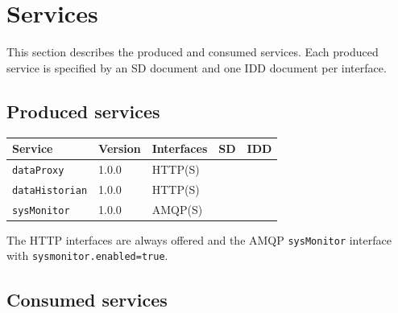 \documentclass[a4paper]{arrowhead}
\begin{document}
\newpage

\section{Services}
\label{sec:services}

This section describes the produced and consumed services. Each produced service is specified by an SD document and one IDD document per interface.

\subsection{Produced services}

\noindent\begin{longtable}{| p{5.3cm} | p{1.3cm} | p{2.6cm} | p{1.6cm} | p{3.6cm} |} \hline
\rowcolor{gray!33} Service & Version & Interfaces & SD & IDD \\ \hline \endhead
\texttt{dataProxy} & 1.0.0 & HTTP(S) & \cite{dm-dataProxy-sd} & \cite{dm-dataProxy-http-idd} \\ \hline
\texttt{dataHistorian} & 1.0.0 & HTTP(S) & \cite{dm-dataHistorian-sd} & \cite{dm-dataHistorian-http-idd} \\ \hline
\texttt{sysMonitor} & 1.0.0 & AMQP(S) & \cite{dm-sysMonitor-sd} & \cite{dm-sysMonitor-amqp-idd} \\ \hline
\end{longtable}

The HTTP interfaces are always offered and the AMQP \texttt{sysMonitor} interface with \texttt{sysmonitor.enabled=true}.

\subsection{Consumed services}
\end{document}
